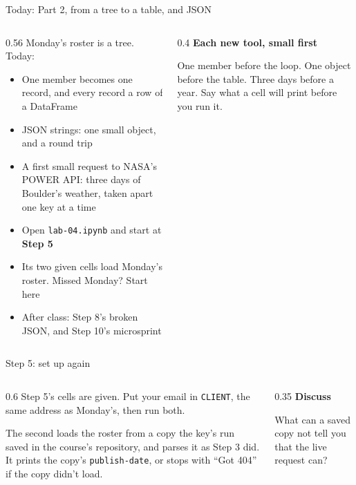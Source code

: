 \documentclass[9pt,aspectratio=169]{beamer}
\begin{document}
\begin{frame}{Today: Part 2, from a tree to a table, and JSON}
    \begin{columns}[T]
        \begin{column}{0.56\textwidth}
            Monday's roster is a tree. Today:
            \begin{itemize}\small
                \item One member becomes one record, and every record a row of a DataFrame
                \item JSON strings: one small object, and a round trip
                \item A first small request to NASA's POWER API: three days of Boulder's weather, taken apart one key at a time
            \end{itemize}

            \medskip
            \begin{itemize}\small
                \item Open \texttt{lab-04.ipynb} and start at \textbf{Step 5}
                \item Its two given cells load Monday's roster. Missed Monday? Start here
                \item After class: Step 8's broken JSON, and Step 10's microsprint
            \end{itemize}
        \end{column}
        \begin{column}{0.4\textwidth}
            \textbf{Each new tool, small first}\\[2pt]
            {\footnotesize One member before the loop. One object before the table. Three days before a year. Say what a cell will print before you run it.\par}
        \end{column}
    \end{columns}
\end{frame}

\begin{frame}{Step 5: set up again}
    \begin{columns}[T]
        \begin{column}{0.6\textwidth}
            Step 5's cells are given. Put your email in \texttt{CLIENT}, the same address as Monday's, then run both.

            \medskip
            The second loads the roster from a copy the key's run saved in the course's repository, and parses it as Step 3 did. It prints the copy's \texttt{publish-date}, or stops with ``Got 404'' if the copy didn't load.
        \end{column}
        \begin{column}{0.35\textwidth}
            \textbf{Discuss}\\[2pt]
            {\footnotesize What can a saved copy not tell you that the live request can?\par}
        \end{column}
    \end{columns}
\end{frame}
\end{document}
